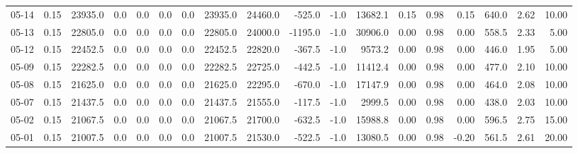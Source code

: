 \begin{threeparttable}
{\begin{tabular}{lrrrrrrrrrrrrrrrrr}
  05-14 &     0.15 & 23935.0 &               0.0 &               0.0 &                0.0 &                0.0 & 23935.0 & 24460.0 &     -525.0 &                     -1.0 &             13682.1 &       0.15 &      0.98 &           0.15 &            640.0 &            2.62 &                  10.00 \\
  05-13 &     0.15 & 22805.0 &               0.0 &               0.0 &                0.0 &                0.0 & 22805.0 & 24000.0 &    -1195.0 &                     -1.0 &             30906.0 &       0.00 &      0.98 &           0.00 &            558.5 &            2.33 &                   5.00 \\
  05-12 &     0.15 & 22452.5 &               0.0 &               0.0 &                0.0 &                0.0 & 22452.5 & 22820.0 &     -367.5 &                     -1.0 &              9573.2 &       0.00 &      0.98 &           0.00 &            446.0 &            1.95 &                   5.00 \\
  05-09 &     0.15 & 22282.5 &               0.0 &               0.0 &                0.0 &                0.0 & 22282.5 & 22725.0 &     -442.5 &                     -1.0 &             11412.4 &       0.00 &      0.98 &           0.00 &            477.0 &            2.10 &                  10.00 \\
  05-08 &     0.15 & 21625.0 &               0.0 &               0.0 &                0.0 &                0.0 & 21625.0 & 22295.0 &     -670.0 &                     -1.0 &             17147.9 &       0.00 &      0.98 &           0.00 &            464.0 &            2.08 &                  10.00 \\
  05-07 &     0.15 & 21437.5 &               0.0 &               0.0 &                0.0 &                0.0 & 21437.5 & 21555.0 &     -117.5 &                     -1.0 &              2999.5 &       0.00 &      0.98 &           0.00 &            438.0 &            2.03 &                  10.00 \\
  05-02 &     0.15 & 21067.5 &               0.0 &               0.0 &                0.0 &                0.0 & 21067.5 & 21700.0 &     -632.5 &                     -1.0 &             15988.8 &       0.00 &      0.98 &           0.00 &            596.5 &            2.75 &                  15.00 \\
  05-01 &     0.15 & 21007.5 &               0.0 &               0.0 &                0.0 &                0.0 & 21007.5 & 21530.0 &     -522.5 &                     -1.0 &             13080.5 &       0.00 &      0.98 &          -0.20 &            561.5 &            2.61 &                  20.00 \\

\end{tabular}}
\end{threeparttable}
